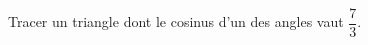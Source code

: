 
\begin{exercice}\label{exo2smath-0146}

    Tracer un triangle dont le cosinus d'un des angles vaut \( \dfrac{ 7 }{ 3 }\).

\end{exercice}
